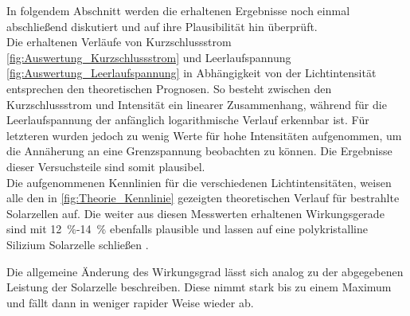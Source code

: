 In folgendem Abschnitt werden die erhaltenen Ergebnisse noch einmal abschließend diskutiert und
auf ihre Plausibilität hin überprüft.\\

Die erhaltenen Verläufe von Kurzschlussstrom \cref{fig:Auswertung_Kurzschlussstrom} und Leerlaufspannung 
\cref{fig:Auswertung_Leerlaufspannung} in Abhängigkeit von der Lichtintensität entsprechen den theoretischen 
Prognosen. So besteht zwischen den Kurzschlussstrom und Intensität ein linearer Zusammenhang, während 
für die Leerlaufspannung der anfänglich logarithmische Verlauf erkennbar ist. Für letzteren wurden jedoch zu wenig 
Werte für hohe Intensitäten aufgenommen, um die Annäherung an eine Grenzspannung beobachten zu können.
Die Ergebnisse dieser Versuchsteile sind somit plausibel.\\

Die aufgenommenen Kennlinien für die verschiedenen Lichtintensitäten, weisen alle den in \cref{fig:Theorie_Kennlinie}
gezeigten theoretischen Verlauf für bestrahlte Solarzellen auf. Die weiter aus diesen Messwerten erhaltenen 
Wirkungsgerade sind mit \SI{12}{\percent}-\SI{14}{\percent} ebenfalls plausible und lassen auf eine polykristalline 
Silizium Solarzelle schließen \cite{Gar07} .

Die allgemeine Änderung des Wirkungsgrad lässt sich analog zu der abgegebenen Leistung der Solarzelle beschreiben.
Diese nimmt stark bis zu einem Maximum und fällt dann in weniger rapider Weise wieder ab.


   